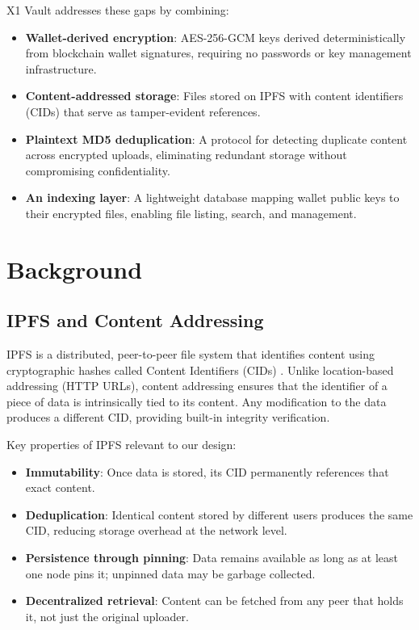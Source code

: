 \documentclass[11pt,a4paper]{article}
\begin{document}
X1 Vault addresses these gaps by combining:

\begin{itemize}
    \item \textbf{Wallet-derived encryption}: AES-256-GCM keys derived deterministically from blockchain wallet signatures, requiring no passwords or key management infrastructure.
    \item \textbf{Content-addressed storage}: Files stored on IPFS with content identifiers (CIDs) that serve as tamper-evident references.
    \item \textbf{Plaintext MD5 deduplication}: A protocol for detecting duplicate content across encrypted uploads, eliminating redundant storage without compromising confidentiality.
    \item \textbf{An indexing layer}: A lightweight database mapping wallet public keys to their encrypted files, enabling file listing, search, and management.
\end{itemize}

\section{Background}

\subsection{IPFS and Content Addressing}

IPFS is a distributed, peer-to-peer file system that identifies content using cryptographic hashes called Content Identifiers (CIDs) \cite{benet2014ipfs}. Unlike location-based addressing (HTTP URLs), content addressing ensures that the identifier of a piece of data is intrinsically tied to its content. Any modification to the data produces a different CID, providing built-in integrity verification.

Key properties of IPFS relevant to our design:

\begin{itemize}
    \item \textbf{Immutability}: Once data is stored, its CID permanently references that exact content.
    \item \textbf{Deduplication}: Identical content stored by different users produces the same CID, reducing storage overhead at the network level.
    \item \textbf{Persistence through pinning}: Data remains available as long as at least one node pins it; unpinned data may be garbage collected.
    \item \textbf{Decentralized retrieval}: Content can be fetched from any peer that holds it, not just the original uploader.
\end{itemize}
\end{document}
